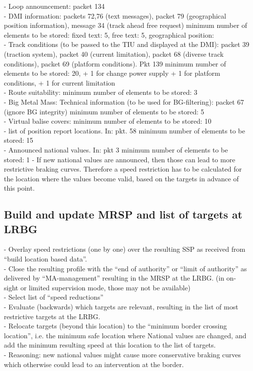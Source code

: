 \documentclass{template/openetcs_report}
\begin{document}
- Loop announcement: packet 134\\
- \gls{DMI} information: packets 72,76 (text messages), packet 79 (geographical position information), message 34 (track ahead free request)  minimum number of elements to be stored: fixed text: 5, free text: 5, geographical position: \\
- Track conditions (to be passed to the TIU and displayed at the \gls{DMI}): packet 39 (traction system), packet 40 (current limitation),  packet 68 (diverse track conditions), packet 69 (platform conditions). Pkt 139  minimum number of elements to be stored: 20, + 1 for change power supply + 1 for platform conditions, + 1 for current limitation\\
- Route suitability: minimum number of elements to be stored: 3\\
- Big Metal Mass: Technical information (to be used for \gls{BG}-filtering): packet 67 (ignore \gls{BG} integrity)  minimum number of elements to be stored: 5\\
- Virtual balise covers:  minimum number of elements to be stored: 10\\
- list of position report locations. In: pkt. 58  minimum number of elements to be stored: 15\\
- Announced national values.  In: pkt 3 minimum number of elements to be stored: 1
- If new national values are announced, then those can lead to more restrictive braking curves. Therefore a speed restriction has to be calculated for the location where the values become valid, based on the targets in advance of this point. \\

\subsection{Build and update MRSP and list of targets at LR\gls{BG}}
- Overlay speed restrictions (one by one) over the resulting SSP as received from “build location based data”.\\
- Close the resulting profile with the “end of authority” or “limit of authority” as delivered by “MA-management” resulting in the MRSP at the LR\gls{BG}.
(in on-sight or limited supervision mode, those may not be available)\\
- Select list of “speed reductions”\\
- Evaluate (backwards) which targets are relevant, resulting in the list of most restrictive targets at the LR\gls{BG}.\\
- Relocate targets (beyond this location) to the “minimum border crossing location”, i.e. the minimum safe location where National values are changed, and add the minimum resulting speed at this location to the list of targets.\\
- Reasoning:  new national values might cause more conservative braking curves which otherwise could lead to an intervention at the border.\\
\end{document}
